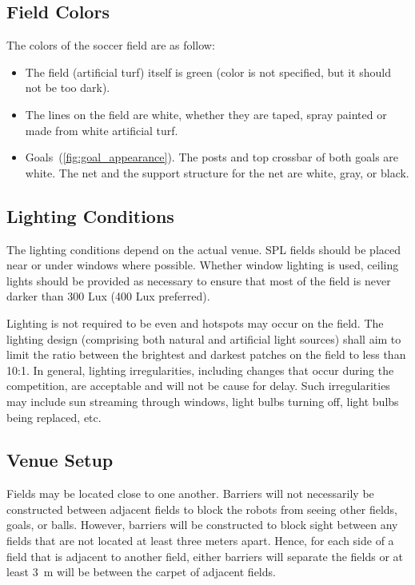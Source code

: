 \subsection{Field Colors}
\label{sec:field_colors}
The colors of the soccer field are as follow:

\begin{itemize}

\item The field (artificial turf) itself is green (color is not specified, but it should not be too dark).

\item The lines on the field are white, whether they are taped, spray painted or made from white artificial turf.

\item Goals~(\cf \cref{fig:goal_appearance}). The posts and top crossbar of both goals are white. The net and the support structure for the net are white, gray, or black.

\end{itemize}

\subsection{Lighting Conditions}
\label{sec:lightConditions}
The lighting conditions depend on the actual venue. SPL fields should be placed near or under windows where possible. Whether window lighting is used, ceiling lights should be provided as necessary to ensure that most of the field is never darker than 300 Lux (400 Lux preferred).

Lighting is not required to be even and hotspots may occur on the field. The lighting design (comprising both natural and artificial light sources) shall aim to limit the ratio between the brightest and darkest patches on the field to less than 10:1. In general, lighting irregularities, including changes that occur during the competition, are acceptable and will not be cause for delay.  Such irregularities may include sun streaming through windows, light bulbs turning off, light bulbs being replaced, etc.

\subsection{Venue Setup}
\label{sec:boundaries}
Fields may be located close to one another.  Barriers will not necessarily be constructed between adjacent fields to block the robots from seeing other fields, goals, or balls. However, barriers will be constructed to block sight between any fields that are not located at least three meters apart. Hence, for each side of a field that is adjacent to another field, either barriers will separate the fields or at least \qty{3}{\metre} will be between the carpet of adjacent fields.

